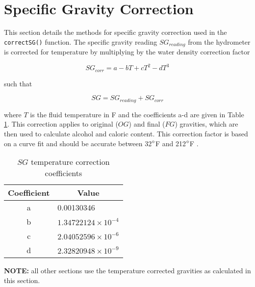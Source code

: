 \documentclass[../main.tex]{subfiles}
\begin{document}
\section{Specific Gravity Correction}
    This section details the methods for specific gravity correction used in the \texttt{correctSG()} function. The specific gravity reading $SG_{reading}$ from the hydrometer is corrected for temperature by multiplying by the water density correction factor
    
    \begin{equation}
        SG_{corr} = a - b T + c T^{2} - d T^{3}
    \end{equation}
    
    such that
    
    \begin{equation}
        SG = SG_{reading} + SG_{corr}
    \end{equation}
    
    where $T$ is the fluid temperature in \tdeg F and the coefficients a-d are given in Table \ref{tab:sgcorr}. This correction applies to original ($OG$) and final ($FG$) gravities, which are then used to calculate alcohol and caloric content. This correction factor is based on a curve fit and should  be accurate between 32${}^{\circ}$F and 212${}^{\circ}$F \cite{hall_1995}.
    
    \begin{table}[H]
        \centering
        \caption{$SG$ temperature correction coefficients}
        \begin{tabular}{cl}
             Coefficient & \multicolumn{1}{c}{Value} \\
             \hline
             a & 0.00130346 \\
             b & $1.34722124 \times 10^{-4}$ \\
             c & $2.04052596 \times 10^{-6}$ \\
             d & $2.32820948 \times 10^{-9}$
        \end{tabular}
        \label{tab:sgcorr}
    \end{table}

    \textbf{NOTE:} all other sections use the temperature corrected gravities as calculated in this section.
    
\end{document}
